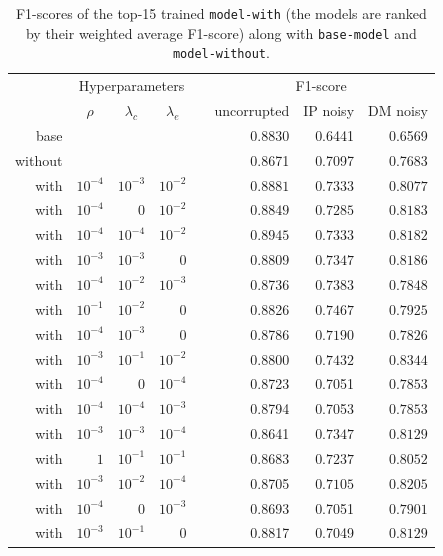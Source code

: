 \begin{table}\centering
{}
\begin{tabular}{@{}rrrrcrrr@{}}\toprule
& \multicolumn{3}{c}{Hyperparameters} & \phantom{abc}& \multicolumn{3}{c}{F1-score}\\
\cmidrule{2-4} \cmidrule{6-8}
& \multicolumn{1}{c}{$\rho$} & \multicolumn{1}{c}{$\lambda_c$} & \multicolumn{1}{c}{$\lambda_e$} && \multicolumn{1}{r}{uncorrupted} & \multicolumn{1}{r}{IP noisy} & \multicolumn{1}{r}{DM noisy}\\ \midrule\midrule
base & & & && 0.8830 & 0.6441 & 0.6569\\
without & & & && 0.8671& 0.7097& 0.7683\\\midrule
with & $10^{-4}$ & $10^{-3}$ & $10^{-2}$ && $\mathbf{0.8881}$& $\mathbf{0.7333}$& $\mathbf{0.8077}$\\
with & $10^{-4}$ & $0$ & $10^{-2}$ && $\mathbf{0.8849}$& $\mathbf{0.7285}$& $\mathbf{0.8183}$\\
with & $10^{-4}$ & $10^{-4}$ & $10^{-2}$ && $\mathbf{0.8945}$& $\mathbf{0.7333}$& $\mathbf{0.8182}$\\
with & $10^{-3}$ & $10^{-3}$ & $0$ && 0.8809& $\mathbf{0.7347}$& $\mathbf{0.8186}$\\
with & $10^{-4}$ & $10^{-2}$ & $10^{-3}$ && 0.8736& $\mathbf{0.7383}$& $\mathbf{0.7848}$\\
with & $10^{-1}$ & $10^{-2}$ & $0$ && 0.8826& $\mathbf{0.7467}$& $\mathbf{0.7925}$\\
with & $10^{-4}$ & $10^{-3}$ & $0$ && 0.8786& $\mathbf{0.7190}$& $\mathbf{0.7826}$\\
with & $10^{-3}$ & $10^{-1}$ & $10^{-2}$ && 0.8800& $\mathbf{0.7432}$& $\mathbf{0.8344}$\\
with & $10^{-4}$ & $0$ & $10^{-4}$ && 0.8723& 0.7051& $\mathbf{0.7853}$\\
with & $10^{-4}$ & $10^{-4}$ & $10^{-3}$ && 0.8794& 0.7053& $\mathbf{0.7853}$\\
with & $10^{-3}$ & $10^{-3}$ & $10^{-4}$ && 0.8641& $\mathbf{0.7347}$& $\mathbf{0.8129}$\\
with & $1$ & $10^{-1}$ & $10^{-1}$ && 0.8683& $\mathbf{0.7237}$& $\mathbf{0.8052}$\\
with & $10^{-3}$ & $10^{-2}$ & $10^{-4}$ && 0.8705& $\mathbf{0.7105}$& $\mathbf{0.8205}$\\
with & $10^{-4}$ & $0$ & $10^{-3}$ && 0.8693& 0.7051& $\mathbf{0.7901}$\\
with & $10^{-3}$ & $10^{-1}$ & $0$ && 0.8817& 0.7049& $\mathbf{0.8129}$\\
\bottomrule
\end{tabular}
\caption{F1-scores of the top-15 trained \texttt{model-with} (the models are ranked by their weighted average F1-score) along with \texttt{base-model} and \texttt{model-without}.}
\label{tab:results}
\end{table}

